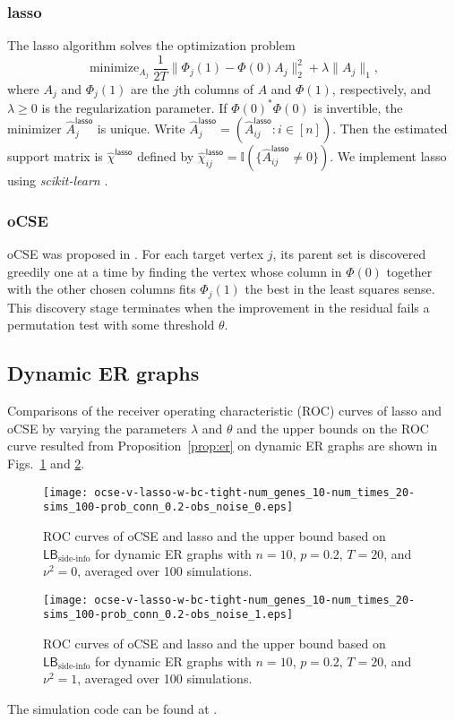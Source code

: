 \documentclass[conference,letterpaper]{IEEEtran}
\DeclareMathOperator*{\minimize}{minimize}%
\newcommand{\ind}[2]{\left(#1\colon #2\right)} %
\newcommand{\T}{^{*}}%
\newcommand{\indicator}[1]{\mathbb{I}(#1)}%
\newcommand{\figWidth}{0.48\textwidth}%
\newcommand{\sigmat}{\nu}%
\newcommand{\suppMatEst}{\widehat\chi}%
\newcommand{\LBSide}{\mathsf{LB}_{\text{side-info}}}%
\begin{document}
\subsubsection{lasso}
The lasso algorithm solves the optimization problem
\[\minimize_{A_j}\frac 1{2T}\|\Phi_j(1)-\Phi(0)A_j\|_2^2 + \lambda\|A_j\|_1,\]
where $A_j$ and $\Phi_j(1)$ are the $j$th columns of $A$ and
$\Phi(1)$, respectively, and $\lambda \ge 0$ is the regularization
parameter.  If $\Phi(0)\T\Phi(0)$ is invertible, the minimizer
$\hat A_j^{\mathsf{lasso}}$ is unique.  Write
$\hat A_j^{\mathsf{lasso}} = \ind{\hat
  A_{ij}^{\mathsf{lasso}}}{i\in[n]}$.  Then the estimated support
matrix is $\suppMatEst^{\mathsf{lasso}}$ defined by
$\suppMatEst_{ij}^{\mathsf{lasso}} = \indicator{\{\hat
  A_{ij}^{\mathsf{lasso}}\neq 0\}}$.  We implement lasso using
\textit{scikit-learn} \cite{PedregosaVaroquauxGramfort11}.
\subsubsection{oCSE}
oCSE was proposed in \cite{SunTaylorBollt15}.  For each target vertex
$j$, its parent set is discovered greedily one at a time by finding
the vertex whose column in $\Phi(0)$ together with the other chosen
columns fits $\Phi_j(1)$ the best in the least squares sense.  This
discovery stage terminates when the improvement in the residual fails
a permutation test with some threshold $\theta.$
\subsection{Dynamic ER graphs}
Comparisons of the receiver operating characteristic (ROC) curves of
lasso and oCSE by varying the parameters $\lambda$ and $\theta$ and
the upper bounds on the ROC curve resulted from
Proposition~\ref{prop:er} on dynamic ER graphs are shown in
Figs.~\ref{fig:ocse-v-lasso-w-bc-tight-n10-t20-s10-o0} and
\ref{fig:ocse-v-lasso-w-bc-tight-n10-t20-s10-o1}.
\begin{figure}[tbhp]
  \centering
  \texttt{[image: ocse-v-lasso-w-bc-tight-num\_genes\_10-num\_times\_20-sims\_100-prob\_conn\_0.2-obs\_noise\_0.eps]}
  \caption{ROC curves of oCSE and lasso and the upper bound based on
    $\LBSide$ for dynamic ER graphs with $n = 10$, $p = 0.2$,
    $T = 20$, and $\sigmat^2 = 0$, averaged over 100 simulations.}
  \label{fig:ocse-v-lasso-w-bc-tight-n10-t20-s10-o0}
\end{figure}%
\begin{figure}[tbhp]
  \centering
  \texttt{[image: ocse-v-lasso-w-bc-tight-num\_genes\_10-num\_times\_20-sims\_100-prob\_conn\_0.2-obs\_noise\_1.eps]}
  \caption{ROC curves of oCSE and lasso and the upper bound based on
    $\LBSide$ for dynamic ER graphs with $n = 10$, $p = 0.2$,
    $T = 20$, and $\sigmat^2 = 1$, averaged over 100 simulations.}
  \label{fig:ocse-v-lasso-w-bc-tight-n10-t20-s10-o1}
\end{figure}%
The simulation code can be found at \cite{Kang21}.
\end{document}
